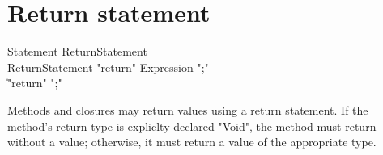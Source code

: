 \section{Return statement}
\label{ReturnStatement}
\begin{grammar}
Statement \: ReturnStatement \\
ReturnStatement \: \xcd"return" Expression \xcd";" \\
             \| \xcd"return" \xcd";" \\
\end{grammar}

Methods and closures may return values using a return statement.
If the method's return type is expliclty declared \xcd"Void",
the method must return without a value; otherwise, it must return
a value of the appropriate type.
